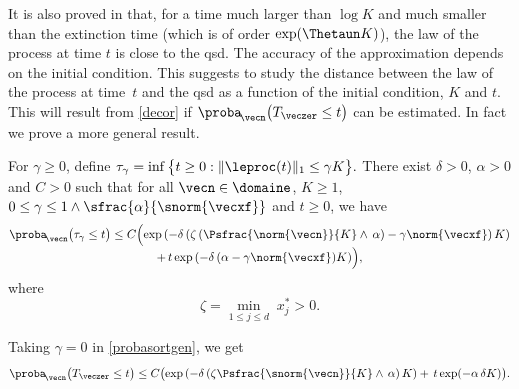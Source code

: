 It is also proved in \cite{ccm2} that, for a time much larger than $\log K$ and much smaller than the extinction time
(which is of order $\exp(\Thetaun K)$), the law of the process at time $t$ is close to the qsd. The accuracy of the
approximation depends on the initial condition. This suggests to study the distance between the law of the process at time~$t$ and
the qsd as a function of the initial condition, $K$ and $t$.
This will result from \eqref{decor} if $\proba_{\!\vecn}\bigl(T_{\veczer}\leq t\bigr)$ can be estimated. In fact we prove a more general
result.

\begin{lemma}\label{sortpas}
For $\gamma\geq 0$, define $\tau_{\gamma}=\inf\big\{t\geq 0:\| \leproc(t)\|_1\le \gamma K\big\}.$
There exist $\delta>0$, $\alpha>0$ and $C>0$ such that for all $\vecn\in\domaine$, $K\ge 1$,
$0\le \gamma\le 1\wedge \sfrac{\alpha}{\snorm{\vecxf}}$ and $t\ge0$, we have
\begin{multline}\label{probasortgen}
\proba_{\!\vecn}\bigl(\tau_{\gamma}\leq t\bigr)
\leq C\Bigl(\exp\left(-\delta\left(\zeta\left(\Psfrac{\norm{\vecn}}{K}\wedge\,\alpha\right)-\gamma \norm{\vecxf}\right)K\right)\\[-3pt]
+\, t \exp\left(-\delta\,(\alpha-\gamma \norm{\vecxf}) K\right)\Bigr),
\end{multline}
where
\begin{equation}\label{def-zeta}
\zeta=\min_{1\le j\le d}\;x^*_{j}>0.
\end{equation}
\end{lemma}
Taking $\gamma=0$ in \eqref{probasortgen}, we get
\begin{equation}\label{probasort}
\proba_{\!\vecn}\bigl(T_{\veczer}\leq t\bigr)
\leq C\bigl(\exp\left(-\delta\left(\zeta\Psfrac{\snorm{\vecn}}{K}\wedge\,\alpha\right)K\right)+\, t \exp(-\alpha\,\delta K)\bigr).
\end{equation}

